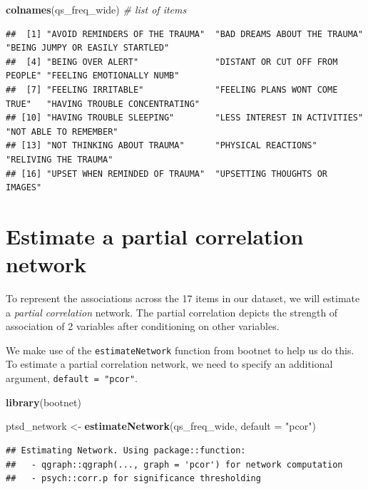\documentclass[
]{book}
\newenvironment{Shaded}{\begin{snugshade}}{\end{snugshade}}
\newcommand{\AttributeTok}[1]{\textcolor[rgb]{0.13,0.29,0.53}{#1}}
\newcommand{\CommentTok}[1]{\textcolor[rgb]{0.56,0.35,0.01}{\textit{#1}}}
\newcommand{\FunctionTok}[1]{\textcolor[rgb]{0.13,0.29,0.53}{\textbf{#1}}}
\newcommand{\NormalTok}[1]{#1}
\newcommand{\OtherTok}[1]{\textcolor[rgb]{0.56,0.35,0.01}{#1}}
\newcommand{\StringTok}[1]{\textcolor[rgb]{0.31,0.60,0.02}{#1}}
\begin{document}
\begin{Shaded}
\begin{Highlighting}[]
\FunctionTok{colnames}\NormalTok{(qs\_freq\_wide) }\CommentTok{\# list of items }
\end{Highlighting}
\end{Shaded}

\begin{verbatim}
##  [1] "AVOID REMINDERS OF THE TRAUMA"  "BAD DREAMS ABOUT THE TRAUMA"    "BEING JUMPY OR EASILY STARTLED"
##  [4] "BEING OVER ALERT"               "DISTANT OR CUT OFF FROM PEOPLE" "FEELING EMOTIONALLY NUMB"      
##  [7] "FEELING IRRITABLE"              "FEELING PLANS WONT COME TRUE"   "HAVING TROUBLE CONCENTRATING"  
## [10] "HAVING TROUBLE SLEEPING"        "LESS INTEREST IN ACTIVITIES"    "NOT ABLE TO REMEMBER"          
## [13] "NOT THINKING ABOUT TRAUMA"      "PHYSICAL REACTIONS"             "RELIVING THE TRAUMA"           
## [16] "UPSET WHEN REMINDED OF TRAUMA"  "UPSETTING THOUGHTS OR IMAGES"
\end{verbatim}

\section{Estimate a partial correlation network}\label{estimate-a-partial-correlation-network}

To represent the associations across the 17 items in our dataset, we will estimate a \emph{partial correlation} network. The partial correlation depicts the strength of association of 2 variables after conditioning on other variables.

We make use of the \texttt{estimateNetwork} function from bootnet to help us do this. To estimate a partial correlation network, we need to specify an additional argument, \texttt{default\ =\ "pcor"}.

\begin{Shaded}
\begin{Highlighting}[]
\FunctionTok{library}\NormalTok{(bootnet)}

\NormalTok{ptsd\_network }\OtherTok{\textless{}{-}} \FunctionTok{estimateNetwork}\NormalTok{(qs\_freq\_wide, }\AttributeTok{default =} \StringTok{"pcor"}\NormalTok{) }
\end{Highlighting}
\end{Shaded}

\begin{verbatim}
## Estimating Network. Using package::function:
##   - qgraph::qgraph(..., graph = 'pcor') for network computation
##   - psych::corr.p for significance thresholding
\end{verbatim}
\end{document}
